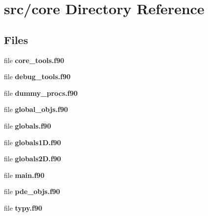 \section{src/core Directory Reference}
\label{dir_aebb8dcc11953d78e620bbef0b9e2183}
\subsection*{Files}
\begin{DoxyCompactItemize}
\item 
file {\bf core\+\_\+tools.\+f90}
\item 
file {\bf debug\+\_\+tools.\+f90}
\item 
file {\bf dummy\+\_\+procs.\+f90}
\item 
file {\bf global\+\_\+objs.\+f90}
\item 
file {\bf globals.\+f90}
\item 
file {\bf globals1\+D.\+f90}
\item 
file {\bf globals2\+D.\+f90}
\item 
file {\bf main.\+f90}
\item 
file {\bf pde\+\_\+objs.\+f90}
\item 
file {\bf typy.\+f90}
\end{DoxyCompactItemize}
